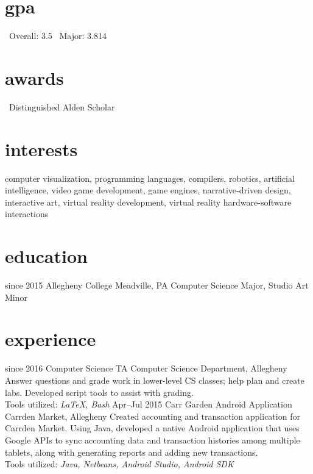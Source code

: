 \documentclass[]{friggeri-cv}
\begin{document}
\begin{aside}
  \section{gpa}
  	\bullet\ Overall: 3.5\vspace{0.1cm}
  	\bullet\ Major: 3.814\vspace{0.1cm}
  \section{awards}
    \bullet\ Distinguished Alden Scholar\vspace{0.1cm}
\end{aside}

\section{interests}

computer visualization, programming languages, compilers, robotics, artificial intelligence, video game development, game engines,  narrative-driven design, interactive art, virtual reality development, virtual reality hardware-software interactions

\section{education}

\begin{entrylist}
  \entry
    {since 2015}
    {Allegheny College}
    {Meadville, PA}
    {Computer Science Major, Studio Art Minor}
\end{entrylist}

\section{experience}

\begin{entrylist}
  \entry
    {since 2016}
    {Computer Science TA}
    { Computer Science Department, Allegheny}
    {Answer questions and grade work in lower-level CS classes; help plan and create labs. Developed script tools to assist with grading.\\Tools utilized: \emph{\LaTeX , Bash}}
  \entry
    {Apr--Jul 2015}
    {Carr Garden Android Application}
    { Carrden Market, Allegheny}
    {Created accounting and transaction application for Carrden Market. Using Java, developed a native Android application that uses Google APIs to sync accounting data and transaction histories among multiple tablets, along with generating reports and adding new transactions.\\Tools utilized: \emph{Java, Netbeans, Android Studio, Android SDK}}
\end{entrylist}
\end{document}

